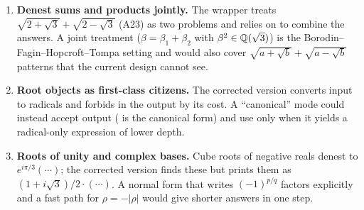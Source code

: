 \begin{enumerate}
      procedure (Borodin--Fagin--Hopcroft--Tompa) that would find A30 in one
      step instead of a two-level multiplier search. Both are cheap to add in
      front of the engine.
\item \textbf{Denest sums and products jointly.} The wrapper treats
      $\sqrt{2+\sqrt3}+\sqrt{2-\sqrt3}$ (A23) as two problems and relies on
       to combine the answers. A joint treatment
      ($\beta=\beta_1+\beta_2$ with $\beta^2\in\mathbb{Q}(\sqrt3)$) is the
      Borodin--Fagin--Hopcroft--Tompa setting and would also cover
      $\sqrt{a+\sqrt b}+\sqrt{a-\sqrt b}$ patterns that the current design
      cannot see.
\item \textbf{Root objects as first-class citizens.} The corrected version
      converts  input to radicals and forbids  in the
      output by its cost. A ``canonical'' mode could instead accept
       output ( is the canonical form) and use
       only when it yields a radical-only expression of lower
      depth.
\item \textbf{Roots of unity and complex bases.} Cube roots of negative reals
      denest to $e^{i\pi/3}(\cdots)$; the corrected version finds these but
      prints them as $(1+i\sqrt3)/2\cdot(\cdots)$. A normal form that writes
      $(-1)^{p/q}$ factors explicitly and a fast path for
      $\rho=-|\rho|$ would give shorter answers in one step.
\end{enumerate}

